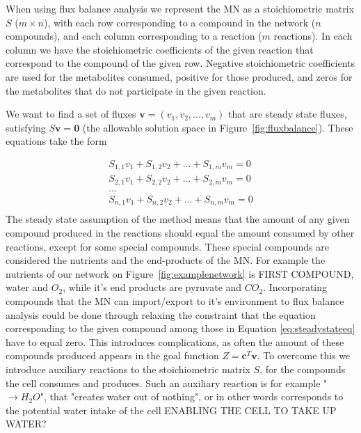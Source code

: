 \documentclass[10pt,a4paper]{article}
\begin{document}
	When using flux balance analysis we represent the MN as a stoichiometric matrix $S$ ($m\times n$), with each row corresponding to a compound in the network ($n$ compounds), and each column corresponding to a reaction ($m$ reactions). In each column we have the stoichiometric coefficients of the given reaction that correspond to the compound of the given row. Negative stoichiometric coefficients are used for the metabolites consumed, positive for those produced, and zeros for the metabolites that do not participate in the given reaction.
	
	We want to find a set of fluxes  $\mathbf{v}=\left( v_1,v_2,...,v_m \right)$ that are steady state fluxes, satisfying $S\mathbf{v}=\mathbf{0}$ (the allowable solution space in Figure~\ref{fig:fluxbalance}). These equations take the form
	
	\begin{equation}\label{eq:steadystateeq}
		\begin{matrix}
			S_{1,1} v_1 + S_{1,2} v_2 + ... + S_{1,m} v_m=0 \\
			S_{2,1} v_1 + S_{2,2} v_2 + ... + S_{2,m} v_m=0 \\
			... \\
			S_{n,1} v_1 + S_{n,2} v_2 + ... + S_{n,m} v_m=0 \\
		\end{matrix}
	\end{equation}
	The steady state assumption of the method means that the amount of any given compound produced in the reactions should equal the amount consumed by other reactions, except for some special compounds. These special compounds are considered the nutrients and the end-products of the MN. For example the nutrients of our network on Figure~\ref {fig:examplenetwork} is FIRST COMPOUND, water and $O_2$, while it's end products are pyruvate and $CO_2$. Incorporating compounds that the MN can import/export to it's environment to flux balance analysis could be done through relaxing the constraint that the equation corresponding to the given compound among those in Equation \ref{eq:steadystateeq} have to equal zero. This introduces complications, as often the amount of these compounds produced appears in the goal function  $Z=\mathbf{c}^T \mathbf{v}$. To overcome this we introduce auxiliary reactions to the stoichiometric matrix $S$, for the compounds the cell consumes and produces. Such an auxiliary reaction is for example " $ \rightarrow H_2O$", that "creates water out of nothing", or in other words corresponds to the potential water intake of the cell ENABLING THE CELL TO TAKE UP WATER?
\end{document}
